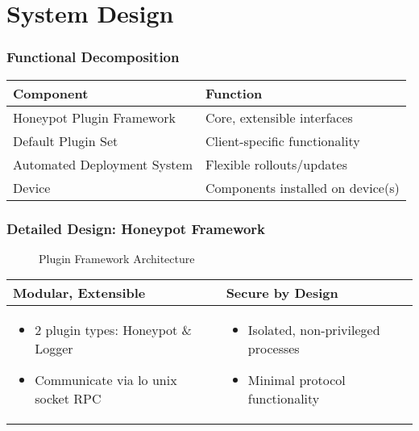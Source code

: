 \section{System Design}

\begin{frame}
\frametitle{Functional Decomposition}


\begin{tabular}{l | l}
\toprule
\textbf{Component} & \textbf{Function} \\
\midrule
Honeypot Plugin Framework & Core, extensible interfaces \\
Default Plugin Set & Client-specific functionality \\
Automated Deployment System & Flexible rollouts/updates \\
Device & Components installed on device(s) \\
\bottomrule
\end{tabular}

\end{frame}

\begin{frame}
\frametitle{Detailed Design: Honeypot Framework}

\begin{figure}
\centering
\caption{Plugin Framework Architecture}
{
\scalebox{0.7}{}
}
\end{figure}

\begin{table}
\centering
\small
\begin{tabularx}{\linewidth}{X X}
\textbf{Modular, Extensible} & \textbf{Secure by Design} \\
\midrule
\begin{itemize}[leftmargin=-0.3mm,after=\vspace{-\baselineskip},noitemsep,nolistsep]
    \item 2 plugin types: Honeypot \& Logger
    \item Communicate via lo unix socket RPC
\end{itemize}
&
\begin{itemize}[leftmargin=-0.3mm,after=\vspace{-\baselineskip},noitemsep,nolistsep]
    \item Isolated, non-privileged processes
    \item Minimal protocol functionality
\end{itemize} \\
\end{tabularx}
\end{table}
\end{frame}

